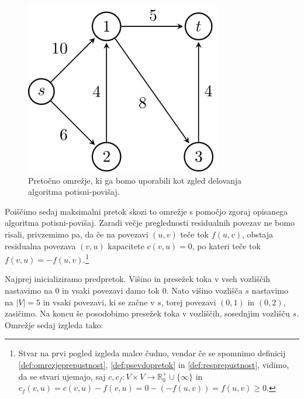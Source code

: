 \documentclass[mat1]{fmfdelo}
\newcommand{\R}{\mathbb R}
\begin{document}
\begin{figure}[H]
  \centering
  \includegraphics[scale=.358]{images/graf2-1/graf2-1-1.jpg}
  \caption{Pretočno omrežje, ki ga bomo uporabili kot zgled delovanja algoritma potisni-povišaj.}
\end{figure}

Poiščimo sedaj maksimalni pretok skozi to omrežje s pomočjo zgoraj opisanega algoritma potisni-povišaj.
Zaradi večje preglednosti residualnih povezav ne bomo risali, privzemimo pa, da če na povezavi $(u,v)$ teče tok $f(u,v)$,
obstaja residualna povezava $(v,u)$ kapacitete $c(v,u) = 0$, po kateri teče tok $f(v,u) = -f(u,v)$.\footnote{Stvar na prvi
pogled izgleda malce čudno, vendar če se spomnimo definicij \ref{def:omrezjeprepustnost}, \ref{def:psevdopretok} in \ref{def:resprepustnost}, vidimo,
da se stvari ujemajo, saj $c, c_f \colon V \times V \rightarrow \R^+_0 \cup \{\infty\}$ in $c_f(v,u) = c(v,u) - f(v,u) = 0 - (-f(u,v)) = f(u,v) \geq 0$.}

Najprej inicializiramo predpretok. Višino in presežek toka v vseh vozliščih na\-sta\-vi\-mo na $0$ in vsaki povezavi
damo tok $0$. Nato višino vozlišča $s$ nastavimo na $|V| = 5$ in vsaki povezavi, ki se začne v $s$, torej
povezavi $(0,1)$ in $(0,2)$, zasičimo. Na koncu še posodobimo presežek toka v vozliščih, sosednjim vozlišču $s$.
Omrežje sedaj izgleda tako:
\end{document}
